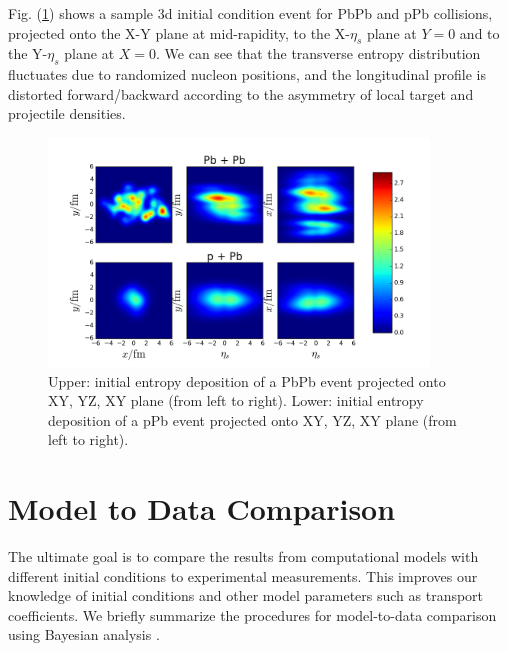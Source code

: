 \documentclass[aps,prl,twocolumn,groupedaddress]{revtex4-1}
\begin{document}
	Fig. (\ref{3d-example}) shows a sample 3d initial condition event for PbPb and pPb collisions, projected onto the X-Y plane at mid-rapidity, to the X-$\eta_s$ plane at $Y = 0$ and to the Y-$\eta_s$ plane at $X = 0$. We can see that the transverse entropy distribution fluctuates due to randomized nucleon positions, and the longitudinal profile is distorted forward/backward according to the asymmetry of local target and projectile densities. 
	\begin{figure}
	\begin{center}
	\includegraphics[width=0.9\textwidth]{pics/3d-example.png}
	\caption{Upper: initial entropy deposition of a PbPb event projected onto XY, YZ, XY plane (from left to right). Lower: initial entropy deposition of a pPb event projected onto XY, YZ, XY plane (from left to right). }\label{3d-example}
	\end{center}
	\end{figure}

\section{Model to Data Comparison}
	The ultimate goal is to compare the results from computational models with different initial conditions to experimental measurements. This improves our knowledge of initial conditions and other model parameters such as transport coefficients. We briefly summarize the procedures for model-to-data comparison using Bayesian analysis \citep{Dave:10.2307/27640080, Bernhard:2015hxa}. 
\end{document}
